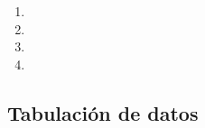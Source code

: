 \begin{itemize}
\begin{itemize}
		\begin{enumerate}
			\item 
			\item 
			\item 
			\item 
		\end{enumerate}
	\end{itemize}
\end{itemize}

\subsection{Tabulación de datos}

 













